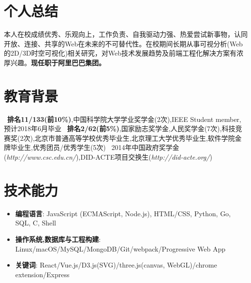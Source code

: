 \documentclass{resume}
\begin{document}




    \section{个人总结}
    本人在校成绩优秀、乐观向上，工作负责、自我驱动力强、热爱尝试新事物，认同开放、连接、共享的Web在未来的不可替代性。在校期间长期从事可视分析(Web的2D/3D时空可视化)相关研究，对Web技术发展趋势及前端工程化解决方案有浓厚兴趣。\textbf{现任职于阿里巴巴集团。}



    \section{教育背景}
    \ \textbf{排名11/133(前10\%)},中国科学院大学学业奖学金(2次),IEEE Student member,预计2018年6月毕业
    \ \textbf{排名2/62(前5\%)},国家励志奖学金,人民奖学金(7次),科技竞赛奖(2次),北京市普通高等学校优秀毕业生,北京理工大学优秀毕业生,软件学院金牌毕业生,优秀团员/优秀学生(5次)
    \ 2014年中国政府奖学金(\textit{http://www.csc.edu.cn/}),DID-ACTE项目交换生(\textit{http://did-acte.org/})



    \section{技术能力}
    \begin{itemize}[parsep=0.2ex]
        \item \textbf{编程语言}: JavaScript (ECMAScript, Node.js), HTML/CSS, Python, Go, SQL, C, Shell
        \item \textbf{操作系统,数据库与工程构建}: Linux/macOS/MySQL/MongoDB/Git/webpack/Progressive Web App
        \item \textbf{关键词}: React/Vue.js/D3.js(SVG)/three.js(canvas, WebGL)/chrome extension/Express
    \end{itemize}
\end{document}

